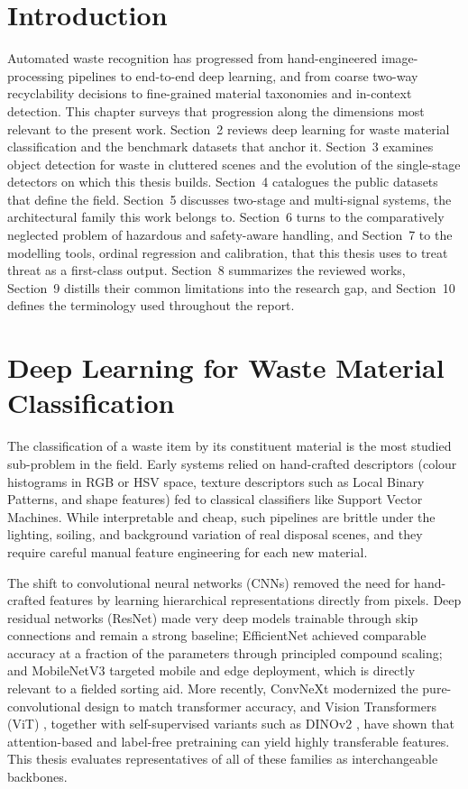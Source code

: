 \section{Introduction}
Automated waste recognition has progressed from hand-engineered image-processing pipelines to end-to-end deep learning, and from coarse two-way recyclability decisions to fine-grained material taxonomies and in-context detection. This chapter surveys that progression along the dimensions most relevant to the present work. Section~2 reviews deep learning for waste material classification and the benchmark datasets that anchor it. Section~3 examines object detection for waste in cluttered scenes and the evolution of the single-stage detectors on which this thesis builds. Section~4 catalogues the public datasets that define the field. Section~5 discusses two-stage and multi-signal systems, the architectural family this work belongs to. Section~6 turns to the comparatively neglected problem of hazardous and safety-aware handling, and Section~7 to the modelling tools, ordinal regression and calibration, that this thesis uses to treat threat as a first-class output. Section~8 summarizes the reviewed works, Section~9 distills their common limitations into the research gap, and Section~10 defines the terminology used throughout the report.

\section{Deep Learning for Waste Material Classification}
The classification of a waste item by its constituent material is the most studied sub-problem in the field. Early systems relied on hand-crafted descriptors (colour histograms in RGB or HSV space, texture descriptors such as Local Binary Patterns, and shape features) fed to classical classifiers like Support Vector Machines. While interpretable and cheap, such pipelines are brittle under the lighting, soiling, and background variation of real disposal scenes, and they require careful manual feature engineering for each new material.

The shift to convolutional neural networks (CNNs) removed the need for hand-crafted features by learning hierarchical representations directly from pixels. Deep residual networks (ResNet) \cite{resnet} made very deep models trainable through skip connections and remain a strong baseline; EfficientNet \cite{efficientnet} achieved comparable accuracy at a fraction of the parameters through principled compound scaling; and MobileNetV3 \cite{mobilenetv3} targeted mobile and edge deployment, which is directly relevant to a fielded sorting aid. More recently, ConvNeXt \cite{convnext} modernized the pure-convolutional design to match transformer accuracy, and Vision Transformers (ViT) \cite{vit}, together with self-supervised variants such as DINOv2 \cite{dinov2}, have shown that attention-based and label-free pretraining can yield highly transferable features. This thesis evaluates representatives of all of these families as interchangeable backbones.

